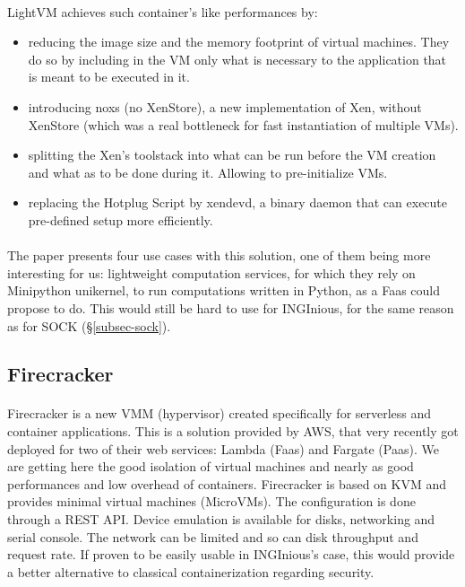 \paragraph{}LightVM achieves such container's like performances by:
\begin{itemize}
\renewcommand\labelitemi{--}
  \item reducing the image size and the memory footprint of virtual machines.  They do so by including in the VM only what is necessary to the application that is meant to be executed in it.
  \item introducing noxs (no XenStore), a new implementation of Xen, without XenStore (which was a real bottleneck for fast instantiation of multiple VMs).
  \item splitting the Xen's toolstack into what can be run before the VM creation and what as to be done during it.  Allowing to pre-initialize VMs.
  \item replacing the Hotplug Script by xendevd, a binary daemon that can execute pre-defined setup more efficiently.
\end{itemize}

\paragraph{} The paper presents four use cases with this solution, one of them being more interesting for us: lightweight computation services, for which they rely on Minipython unikernel, to run computations written in Python, as a Faas could propose to do.  This would still be hard to use for INGInious, for the same reason as for SOCK (§\ref{subsec-sock}).

\subsection{Firecracker} 
\paragraph{} Firecracker is a new VMM (hypervisor) created specifically for serverless and container applications.  \cite{agachefirecracker}  This is a solution provided by AWS, that very recently got deployed for two of their web services: Lambda (Faas) and Fargate (Paas).  We are getting here the good isolation of virtual machines and nearly as good performances and low overhead of containers.  Firecracker is based on KVM and provides minimal virtual machines (MicroVMs).  The configuration is done through a REST API.  Device emulation is available for disks, networking and serial console.  The network can be limited and so can disk throughput and request rate.  If proven to be easily usable in INGInious's case, this would provide a better alternative to classical containerization regarding security.

